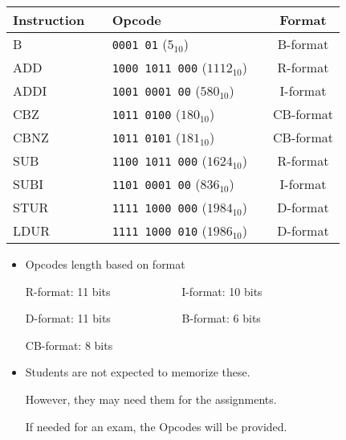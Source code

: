 \begin{frame}[fragile]
  \begin{center}
  \begin{tabular}{llc}
    Instruction~~ & Opcode & Format\\
    \hline
    B    & \texttt{0001\,01} {\tiny{($5_{10}$)}} & B-format\\
    ADD  & \texttt{1000\,1011\,000} {\tiny{($1112_{10}$)}}~~ & R-format\\
    ADDI & \texttt{1001\,0001\,00} {\tiny{($580_{10}$)}} & I-format\\
    CBZ  & \texttt{1011\,0100} {\tiny{($180_{10}$)}}& CB-format\\
    CBNZ & \texttt{1011\,0101} {\tiny{($181_{10}$)}}& CB-format\\
    SUB  & \texttt{1100\,1011\,000} {\tiny{($1624_{10}$)}} & R-format\\
    SUBI & \texttt{1101\,0001\,00} {\tiny{($836_{10}$)}} & I-format\\
    STUR & \texttt{1111\,1000\,000} {\tiny{($1984_{10}$)}} & D-format\\
    LDUR & \texttt{1111\,1000\,010} {\tiny{($1986_{10}$)}} & D-format\\
  \end{tabular}
  \begin{itemize}
  \item Opcodes length based on format

    R-format: 11 bits~~~~~~~~~~~~
    I-format: 10 bits

    D-format: 11 bits~~~~~~~~~~~~
    B-format: 6 bits

    CB-format: 8 bits

    \end{itemize}
  \end{center}
\BNotes\ifnum{}
\begin{itemize}
\item Students are not expected to memorize these.

	However, they may need them for the assignments.

	If needed for an exam, the Opcodes will be provided.
\end{itemize}
\fi\ENotes
  
\end{frame}

